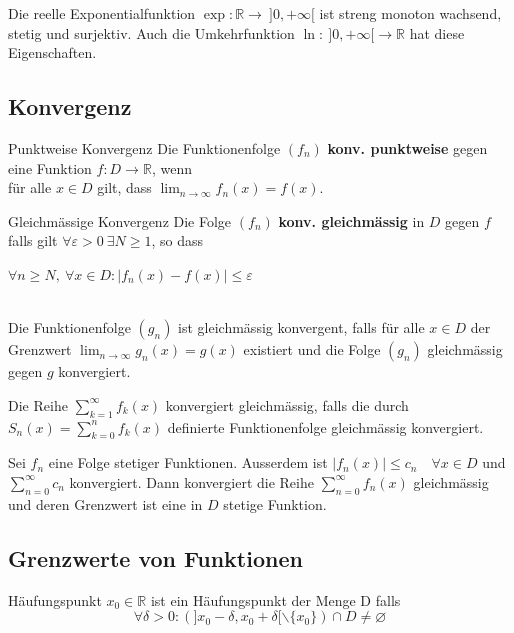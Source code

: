 \documentclass[a4paper,10pt]{article}
\def\limn{\lim_{n\to \infty}}
\def\sumk{\sum_{k=1}^\infty}
\def\R{\mathbb{R}}
\begin{document}
\begin{subbox}{Die reelle Exponentialfunktion}
	$\exp: \R \to \ ]0,+\infty[$ ist streng monoton wachsend, stetig und surjektiv. Auch die Umkehrfunktion $\ln: \ ]0,+\infty[ \to \R$ hat diese Eigenschaften.
\end{subbox}

\subsection{Konvergenz}

\begin{mainbox}{Punktweise Konvergenz}
	Die Funktionenfolge $(f_n)$ \textbf{konv. punktweise} gegen eine Funktion $f: D \to \R$, wenn\\ für alle $x \in D$ gilt, dass $\limn f_n(x) = f(x)$.
\end{mainbox}

\begin{mainbox}{Gleichmässige Konvergenz}
	Die Folge $(f_n)$ \textbf{konv. gleichmässig} in $D$ gegen $f$ \\falls gilt $\forall \varepsilon > 0 \ \exists N \ge 1$, so dass \\
	\centerline{$\forall n \ge N, \ \forall x \in D: | f_n(x) - f(x) | \le \varepsilon$}\\
	Die Funktionenfolge $(g_n)$ ist gleichmässig konvergent, falls für alle $x\in D$ der Grenzwert $\limn g_n(x) = g(x)$ existiert und die Folge $(g_n)$ gleichmässig gegen $g$ konvergiert.
\end{mainbox}
Die Reihe $\sumk f_k(x)$ konvergiert gleichmässig, falls die durch $S_n(x) = \sum_{k=0}^n f_k(x)$ definierte Funktionenfolge gleichmässig konvergiert.

\begin{subbox}{}
	Sei $f_n$ eine Folge stetiger Funktionen. Ausserdem ist $|f_n(x)| \le c_n \quad \forall x \in D$ und $\sum_{n=0}^\infty c_n$ konvergiert. Dann konvergiert die Reihe $\sum_{n=0}^\infty f_n(x)$ gleichmässig und deren Grenzwert ist eine in $D$ stetige Funktion.
\end{subbox}

\subsection{Grenzwerte von Funktionen}
\begin{subbox}{Häufungspunkt}
	$x_0 \in \R$ ist ein Häufungspunkt der Menge D falls $$\forall \delta > 0: (]x_0 - \delta, x_0 + \delta[ \backslash \{x_0\}) \cap D \ne \varnothing$$
\end{subbox}
\end{document}
